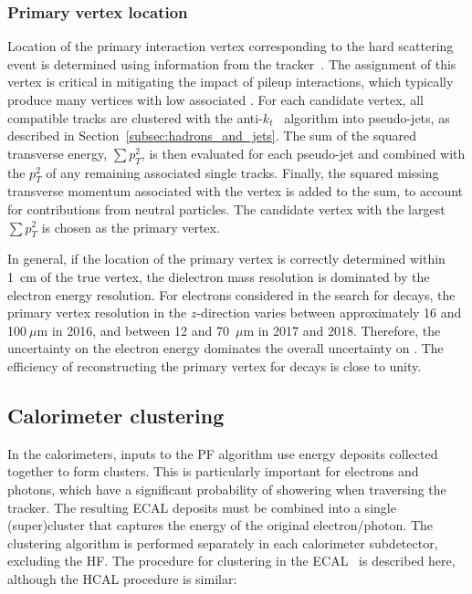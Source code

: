 \subsubsection{Primary vertex location}


Location of the primary interaction vertex corresponding to the hard scattering event is determined using information from the tracker~\cite{primary_vertex_finding}. The assignment of this vertex is critical in mitigating the impact of pileup interactions, which typically produce many vertices with low associated \pt. For each candidate vertex, all compatible tracks are clustered with the anti-$k_{t}$~\cite{anti-kt} algorithm into pseudo-jets, as described in Section~\ref{subsec:hadrons_and_jets}. The sum of the squared transverse energy, $\sum p^{2}_{T}$, is then evaluated for each pseudo-jet and combined with the $p^{2}_{T}$ of any remaining associated single tracks. Finally, the squared missing transverse momentum associated with the vertex is added to the sum, to account for contributions from neutral particles. The candidate vertex with the largest $\sum p^{2}_{T}$ is chosen as the primary vertex. 

In general, if the location of the primary vertex is correctly determined within 1~cm of the true vertex, the dielectron mass resolution is dominated by the electron energy resolution. For electrons considered in the search for \Hee decays, the primary vertex resolution in the $z$-direction varies between approximately 16 and 100$~\mu\mathrm{m}$ in 2016, and between 12 and 70~$\mu\mathrm{m}$ in 2017 and 2018. Therefore, the uncertainty on the electron energy dominates the overall uncertainty on \mee. The efficiency of reconstructing the primary vertex for \Hee decays is close to unity.

\subsection{Calorimeter clustering}

In the calorimeters, inputs to the PF algorithm use energy deposits collected together to form clusters. This is particularly important for electrons and photons, which have a significant probability of showering when traversing the tracker. The resulting ECAL deposits must be combined into a single (super)cluster that captures the energy of the original electron/photon. The clustering algorithm is performed separately in each calorimeter subdetector, excluding the HF. The procedure for clustering in the ECAL~\cite{particle_flow,CMS_egamma_performance} is described here, although the HCAL procedure is similar:

